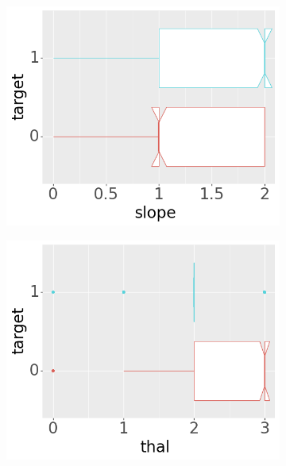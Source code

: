 \begin{figure}[btp]
     \begin{subfigure}[b]{0.32\textwidth}
         \centering
         \includegraphics[width=\textwidth]{plots/target-slope}
     \end{subfigure}
     \begin{subfigure}[b]{0.32\textwidth}
         \centering
         \includegraphics[width=\textwidth]{plots/target-thal}
     \end{subfigure}
     \begin{subfigure}[b]{0.32\textwidth}
         \centering

\end{subfigure}
\end{figure}
